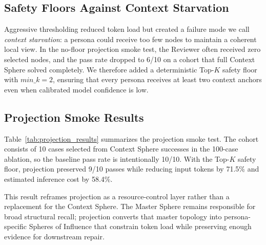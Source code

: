 \subsection{Safety Floors Against Context Starvation}

Aggressive thresholding reduced token load but created a failure mode we call \textit{context starvation}: a persona could receive too few nodes to maintain a coherent local view. In the no-floor projection smoke test, the Reviewer often received zero selected nodes, and the pass rate dropped to 6/10 on a cohort that full Context Sphere solved completely. We therefore added a deterministic Top-\(K\) safety floor with \(min\_k=2\), ensuring that every persona receives at least two context anchors even when calibrated model confidence is low.

\subsection{Projection Smoke Results}

Table~\ref{tab:projection_results} summarizes the projection smoke test. The cohort consists of 10 cases selected from Context Sphere successes in the 100-case ablation, so the baseline pass rate is intentionally 10/10. With the Top-\(K\) safety floor, projection preserved 9/10 passes while reducing input tokens by 71.5\% and estimated inference cost by 58.4\%.

\begin{table}[t]
\centering
\caption{Projection-mode routing on a 10-case Context Sphere success cohort.}
\label{tab:projection_results}
\end{table}

This result reframes projection as a resource-control layer rather than a replacement for the Context Sphere. The Master Sphere remains responsible for broad structural recall; projection converts that master topology into persona-specific Spheres of Influence that constrain token load while preserving enough evidence for downstream repair.

